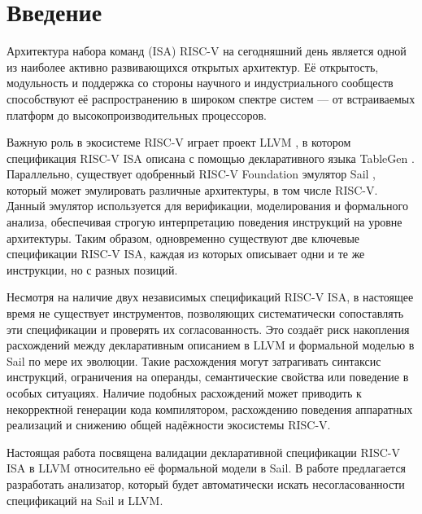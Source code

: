
\section*{Введение}
\thispagestyle{withCompileDate}

Архитектура набора команд (ISA) RISC-V \cite{waterman2014risc} на сегодняшний день является одной из наиболее активно развивающихся открытых архитектур.
Её открытость, модульность и поддержка со стороны научного и индустриального сообществ способствуют её распространению в широком спектре систем — от встраиваемых платформ до высокопроизводительных процессоров.

Важную роль в экосистеме RISC-V играет проект LLVM \cite{lattner2004llvm}, в котором спецификация RISC-V ISA описана с помощью декларативного языка TableGen \cite{tblgen}.
Параллельно, существует одобренный RISC-V Foundation эмулятор Sail \cite{gray2017sail}, который может эмулировать различные архитектуры, в том числе RISC-V.
Данный эмулятор используется для верификации, моделирования и формального анализа, обеспечивая строгую интерпретацию поведения инструкций на уровне архитектуры.
Таким образом, одновременно существуют две ключевые спецификации RISC-V ISA, каждая из которых описывает одни и те же инструкции, но с разных позиций.

Несмотря на наличие двух независимых спецификаций RISC-V ISA, в настоящее время не существует инструментов, позволяющих систематически сопоставлять эти спецификации и проверять их согласованность.
Это создаёт риск накопления расхождений между декларативным описанием в LLVM и формальной моделью в Sail по мере их эволюции.
Такие расхождения могут затрагивать синтаксис инструкций, ограничения на операнды, семантические свойства или поведение в особых ситуациях.
Наличие подобных расхождений может приводить к некорректной генерации кода компилятором, расхождению поведения аппаратных реализаций и снижению общей надёжности экосистемы RISC-V.

Настоящая работа посвящена валидации декларативной спецификации RISC-V ISA в LLVM относительно её формальной модели в Sail.
В работе предлагается разработать анализатор, который будет автоматически искать несогласованности спецификаций на Sail и LLVM.



